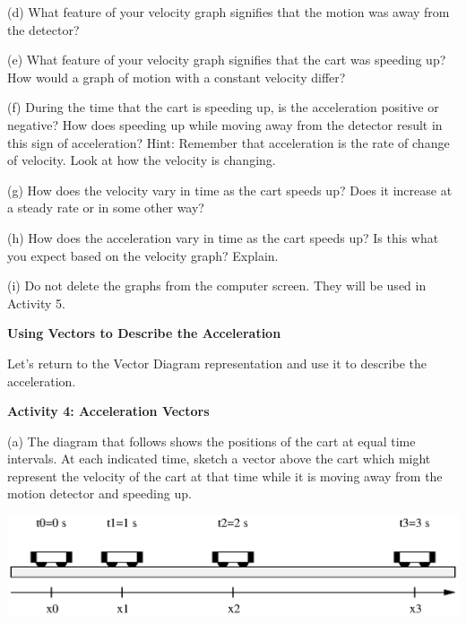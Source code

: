 (d) What feature of your velocity graph signifies that the motion was away from
the detector? 
\vspace{13mm}

(e) What feature of your velocity graph signifies that the cart was speeding
up? How would a graph of motion with a constant velocity differ? 
\vspace{13mm}

(f) During the time that the cart is speeding up, is the acceleration positive
or negative? How does speeding up while moving away from the detector result
in this sign of acceleration? Hint: Remember that acceleration is the rate of
change of velocity. Look at how the velocity is changing. 
\vspace{13mm}

(g) How does the velocity vary in time as the cart speeds up? Does it increase
at a steady rate or in some other way? 
\vspace{13mm}

(h) How does the acceleration vary in time as the cart speeds up? Is this what
you expect based on the velocity graph? Explain.
\vspace{13mm}

(i) Do not delete the graphs from the computer screen.  They will be used in Activity 5.
\vspace{10mm}

\textbf{Using Vectors to Describe the Acceleration} 

Let's return to the Vector Diagram representation and use it to describe the
acceleration.

\textbf{Activity 4: Acceleration Vectors} 

(a) The diagram that follows shows the positions of the cart at equal time intervals.
At each indicated time, sketch a vector above the cart which might represent
the velocity of the cart at that time while it is moving away from the motion
detector and speeding up.

\vspace{0.3cm}
{\par\centering \includegraphics{changing_fig4.eps} \par}
\vspace{0.3cm}

